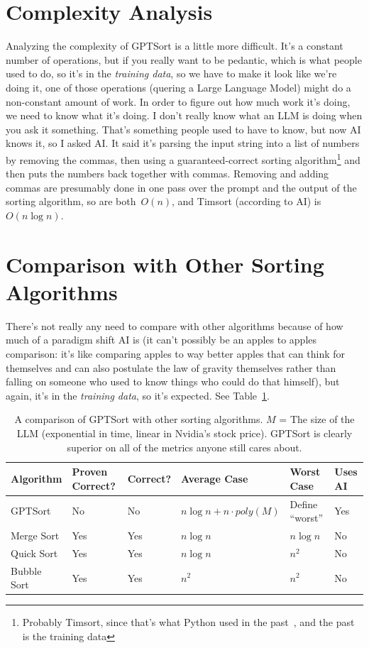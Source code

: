 \documentclass[sigconf]{acmart}\settopmatter{printfolios=false,printccs=false,printacmref=false}
\theoremstyle{definition}
\begin{document}
\section{Complexity Analysis}
Analyzing the complexity of GPTSort is a little more difficult.
%
It's a constant number of operations, but if you really want to be
pedantic, which is what people used to do, so it's in the {\em training data},
so we have to make it look like we're doing it, one of those operations
(quering a Large Language Model) might do a non-constant amount of work.
%
In order to figure out how much work it's doing, we need to know what it's
doing.
%
I don't really know what an LLM is doing when you ask it something.
%
That's something people used to have to know, but now AI knows it, so I asked
AI.
%
It said it's parsing the input string into a list of numbers by removing the
commas, then using a guaranteed-correct sorting algorithm\footnote{Probably
Timsort, since that's what Python used in the past~\cite{powersort}, and
the past is the training data} and then puts the numbers back together with
commas.
%
Removing and adding commas are presumably done in one pass over the prompt
and the output of the sorting algorithm, so are
both~$O(n)$, and Timsort (according
to AI) is~$O(n\log n)$.

\section{Comparison with Other Sorting Algorithms}\label{sec:compare}
There's not really any need to compare with other algorithms because of
how much of a paradigm shift AI is (it can't possibly be an apples to apples
comparison: it's like comparing apples to way better apples that can think for
themselves and can also postulate the law of gravity themselves rather than
falling on someone who used to know things who could do that himself),
but again, it's in the {\em training data}, so it's expected.
%
See Table~\ref{tab:compare}.

\begin{table}
  \begin{tabular}{l l l l l l}
    \toprule
    Algorithm & Proven Correct? & Correct? & Average Case & Worst Case & Uses AI\\
    \midrule
    GPTSort & No & No & $n \log n + n\cdot \mathit{poly}(M)$ & Define ``worst'' & Yes\\
      Merge Sort & Yes & Yes & $n \log n$ & $n \log n$ & No\\
      Quick Sort & Yes & Yes & $n \log n$ & $n^2$ & No\\
      Bubble Sort & Yes & Yes & $n^2$ & $n^2$ & No\\
      \bottomrule
  \end{tabular}
  \caption{A comparison of GPTSort with other sorting algorithms.
    $M$ = The size of the LLM (exponential in time, linear in Nvidia's stock price). GPTSort is clearly superior on all of the metrics anyone still cares about.}
  \label{tab:compare}
\end{table}
    
\end{document}
